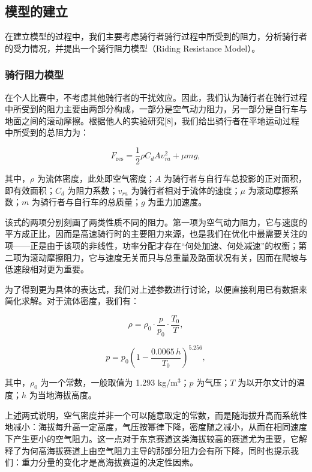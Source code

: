 \documentclass[11pt,a4paper]{ctexart}
\begin{document}
\subsection{模型的建立}

在建立模型的过程中，我们主要考虑骑行者骑行过程中所受到的阻力，分析骑行者的受力情况，并提出一个骑行阻力模型（Riding Resistance Model）。

\subsubsection{骑行阻力模型}

在个人比赛中，不考虑其他骑行者的干扰效应。因此，我们认为骑行者在骑行过程中所受到的阻力主要由两部分构成，一部分是空气动力阻力，另一部分是自行车与地面之间的滚动摩擦。根据他人的实验研究[8]，我们给出骑行者在平地运动过程中所受到的总阻力为：

\begin{equation}
F_{\mathrm{res}} = \frac{1}{2}\rho C_d A v_{ra}^2 + \mu m g,
\end{equation}

其中，$\rho$ 为流体密度，此处即空气密度；$A$ 为骑行者与自行车总投影的正对面积，即有效面积；$C_d$ 为阻力系数；$v_{ra}$ 为骑行者相对于流体的速度；$\mu$ 为滚动摩擦系数；$m$ 为骑行者与自行车的总质量；$g$ 为重力加速度。

该式的两项分别刻画了两类性质不同的阻力。第一项为空气动力阻力，它与速度的平方成正比，因而是高速骑行时的主要阻力来源，也是我们在优化中最需要关注的项——正是由于该项的非线性，功率分配才存在“何处加速、何处减速”的权衡；第二项为滚动摩擦阻力，它与速度无关而只与总重量及路面状况有关，因而在爬坡与低速段相对更为重要。

为了得到更为具体的表达式，我们对上述参数进行讨论，以便直接利用已有数据来简化求解。对于流体密度，我们有：

\begin{equation}
\rho = \rho_0 \cdot \frac{p}{p_0} \cdot \frac{T_0}{T},
\end{equation}

\begin{equation}
p = p_0\left(1 - \frac{0.0065\,h}{T_0}\right)^{5.256},
\end{equation}

其中，$\rho_0$ 为一个常数，一般取值为 1.293 kg/m$^3$；$p$ 为气压；$T$ 为以开尔文计的温度；$h$ 为当地海拔高度。

上述两式说明，空气密度并非一个可以随意取定的常数，而是随海拔升高而系统性地减小：海拔每升高一定高度，气压按幂律下降，密度随之减小，从而在相同速度下产生更小的空气阻力。这一点对于东京赛道这类海拔较高的赛道尤为重要，它解释了为何高海拔赛道上由空气阻力主导的那部分阻力会有所下降，同时也提示我们：重力分量的变化才是高海拔赛道的决定性因素。
\end{document}
